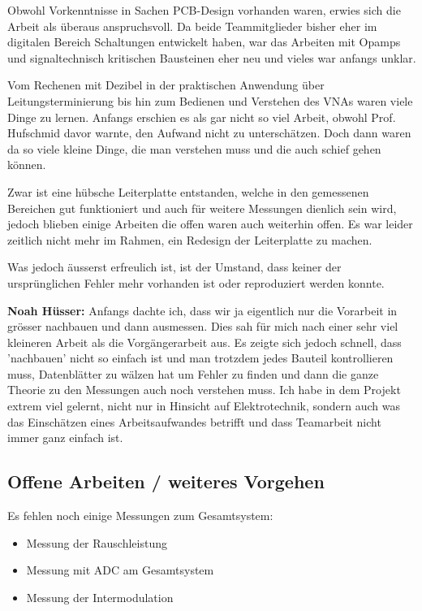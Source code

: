 Obwohl Vorkenntnisse in Sachen PCB-Design vorhanden waren, erwies sich die Arbeit als überaus anspruchsvoll. Da beide Teammitglieder bisher eher im digitalen Bereich Schaltungen entwickelt haben, war das Arbeiten mit Opamps und signaltechnisch kritischen Bausteinen eher neu und vieles war anfangs unklar.

Vom Rechenen mit Dezibel in der praktischen Anwendung über Leitungsterminierung bis hin zum Bedienen und Verstehen des VNAs waren viele Dinge zu lernen. Anfangs erschien es als gar nicht so viel Arbeit, obwohl Prof. Hufschmid davor warnte, den Aufwand nicht zu unterschätzen. Doch dann waren da so viele kleine Dinge, die man verstehen muss und die auch schief gehen können.

Zwar ist eine hübsche Leiterplatte entstanden, welche in den gemessenen Bereichen gut funktioniert und auch für weitere Messungen dienlich sein wird, jedoch blieben einige Arbeiten die offen waren auch weiterhin offen. Es war leider zeitlich nicht mehr im Rahmen, ein Redesign der Leiterplatte zu machen.

Was jedoch äusserst erfreulich ist, ist der Umstand, dass keiner der ursprünglichen Fehler mehr vorhanden ist oder reproduziert werden konnte.

\textbf{Noah Hüsser:} Anfangs dachte ich, dass wir ja eigentlich nur die Vorarbeit in grösser nachbauen und dann ausmessen. Dies sah für mich nach einer sehr viel kleineren Arbeit als die Vorgängerarbeit aus. Es zeigte sich jedoch schnell, dass 'nachbauen' nicht so einfach ist und man trotzdem jedes Bauteil kontrollieren muss, Datenblätter zu wälzen hat um Fehler zu finden und dann die ganze Theorie zu den Messungen auch noch verstehen muss. Ich habe in dem Projekt extrem viel gelernt, nicht nur in Hinsicht auf Elektrotechnik, sondern auch was das Einschätzen eines Arbeitsaufwandes betrifft und dass Teamarbeit nicht immer ganz einfach ist.

\subsection*{Offene Arbeiten / weiteres Vorgehen}
Es fehlen noch einige Messungen zum Gesamtsystem:
\begin{itemize}
    \item Messung der Rauschleistung
    \item Messung mit ADC am Gesamtsystem
    \item Messung der Intermodulation
\end{itemize}

